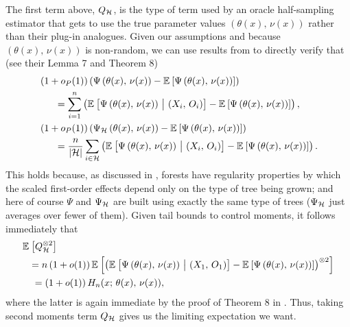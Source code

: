 \documentclass[aos]{imsart}
\theoremstyle{plain}
\theoremstyle{definition}
\theoremstyle{remark}
\begin{document}
\begin{CJK}{UTF8}{gbsn}
{\begin{appendix}
The first term above, $Q_{\mathcal{H}}$, is the type of term used by an oracle half-sampling estimator that gets to use the
true parameter values $(\theta(x), \, \nu(x))$ rather than their plug-in analogues.
Given our assumptions and because $(\theta(x), \, \nu(x))$ is non-random, we can use results from
\citet{wager2015estimation} to directly verify that (see their Lemma 7 and Theorem 8)
\begin{equation}
\label{eq:hajek}
\begin{split}
&\p{1 + o_P(1)}\p{\Psi\p{\theta(x), \, \nu(x)} - \EE{\Psi\p{\theta(x), \, \nu(x)}}} \\
&\ \ \ \ \  = \sum_{i = 1}^n \p{\EE{\Psi\p{\theta(x), \, \nu(x)} \cond \p{X_i, \, O_i}} - \EE{\Psi\p{\theta(x), \, \nu(x)}}}, \\
&\p{1 + o_P(1)} \p{\Psi_{\hh}\p{\theta(x), \, \nu(x)} - \EE{\Psi\p{\theta(x), \, \nu(x)}}} \\
&\ \ \ \ \ = \frac{n}{\abs{\hh}} \sum_{i \in \hh} \p{\EE{\Psi\p{\theta(x), \, \nu(x)} \cond \p{X_i, \, O_i}} - \EE{\Psi\p{\theta(x), \, \nu(x)}}}.
\end{split}
\end{equation}
This holds because, as discussed in \citet{wager2015estimation}, forests
have regularity properties by which the scaled first-order effects
depend only on the type of tree being grown; and here of course $\Psi$ and $\Psi_{\mathcal{H}}$
are built using exactly the same type of trees ($\Psi_{\mathcal{H}}$ just averages over fewer of them).
Given tail bounds to control moments, it follows immediately that
\begin{align*}
&\EE{Q_{\hh}^{\otimes 2}} \\
&\ \ = n\p{1 + o(1)} \EE{ \p{\EE{\Psi\p{\theta(x), \, \nu(x)} \cond \p{X_1, \, O_1}} - \EE{\Psi\p{\theta(x), \, \nu(x)}}}^{\otimes 2}} \\
&\ \ \ = \p{1 + o(1)} H_n(x; \, \theta(x), \, \nu(x)),
\end{align*}
where the latter is again immediate by the proof of Theorem 8 in \citet{wager2015estimation}.
Thus, taking second moments term $Q_{\mathcal{H}}$ gives us the limiting expectation we want.


\end{appendix}}
\end{CJK}
\end{document}
